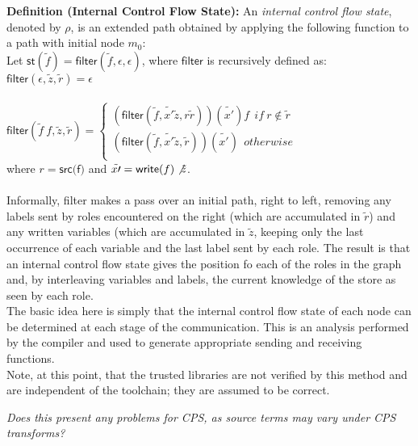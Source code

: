 \documentclass[a4paper,10pt]{article}
\begin{document}
\textbf{Definition (Internal Control Flow State):} An \emph{internal control flow state}, denoted by
$\rho$, is an extended path obtained by applying the following function to a path with initial node
$m_0$:\\
Let $\textsf{st}(\tilde{f}) = \textsf{filter}(\tilde{f}, \epsilon, \epsilon)$, where $\textsf{filter}$
is recursively defined as:\\
$\textsf{filter}(\epsilon, \tilde{z}, \tilde{r}) = \epsilon$\\
\\
\begin{math}
\textsf{filter}(\tilde{f}\ f, \tilde{z}, \tilde{r}) =
\begin{cases}
(\textsf{filter}(\tilde{f}, \tilde{x\prime} \tilde{z}, r \tilde{r})) (\tilde{x\prime})f
\ \ if\ r \notin \tilde{r}\\
(\textsf{filter}(\tilde{f}, \tilde{x\prime} \tilde{z}, \tilde{r})) (\tilde{x\prime})\ \ otherwise\\
\end{cases}
\end{math}
\\
where $r = \textsf{src(f)}$ and $\tilde{x\prime} = \textsf{write}(f) \not \tilde{z}$.\\
\\
Informally, \textsf{filter} makes a pass over an initial path, right to left, removing any labels sent
by roles encountered on the right (which are accumulated in $\tilde{r}$) and any written variables
(which are accumulated in $\tilde{z}$, keeping only the last occurrence of each variable and the last
label sent by each role.  The result is that an internal control flow state gives the position fo each
of the roles in the graph and, by interleaving variables and labels, the current knowledge of the
store as seen by each role.\\

The basic idea here is simply that the internal control flow state of each node can be determined
at each stage of the communication.  This is an analysis performed by the compiler and used to
generate appropriate sending and receiving functions.\\

Note, at this point, that the trusted libraries are not verified by this method and are independent
of the toolchain; they are assumed to be correct.

\emph{Does this present any problems for CPS, as source terms may vary under CPS transforms?}\\
\end{document}
